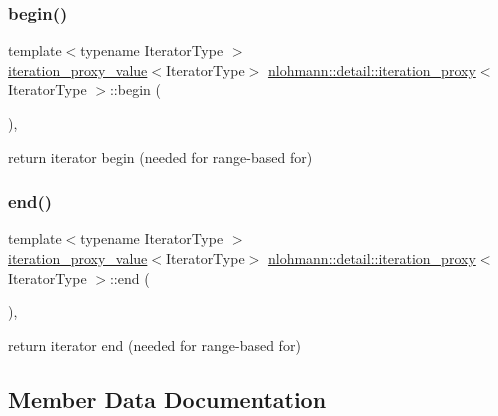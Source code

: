 \subsubsection{\texorpdfstring{begin()}{begin()}}
{\footnotesize\ttfamily template$<$typename Iterator\+Type $>$ \\
\mbox{\hyperlink{classnlohmann_1_1detail_1_1iteration__proxy__value}{iteration\+\_\+proxy\+\_\+value}}$<$Iterator\+Type$>$ \mbox{\hyperlink{classnlohmann_1_1detail_1_1iteration__proxy}{nlohmann\+::detail\+::iteration\+\_\+proxy}}$<$ Iterator\+Type $>$\+::begin (\begin{DoxyParamCaption}{ }\end{DoxyParamCaption})\hspace{0.3cm}{\ttfamily [inline]}, {\ttfamily [noexcept]}}



return iterator begin (needed for range-\/based for) 

\mbox{\label{classnlohmann_1_1detail_1_1iteration__proxy_a90091f8492d23576edef72c5e8b9d4cf}} 
\subsubsection{\texorpdfstring{end()}{end()}}
{\footnotesize\ttfamily template$<$typename Iterator\+Type $>$ \\
\mbox{\hyperlink{classnlohmann_1_1detail_1_1iteration__proxy__value}{iteration\+\_\+proxy\+\_\+value}}$<$Iterator\+Type$>$ \mbox{\hyperlink{classnlohmann_1_1detail_1_1iteration__proxy}{nlohmann\+::detail\+::iteration\+\_\+proxy}}$<$ Iterator\+Type $>$\+::end (\begin{DoxyParamCaption}{ }\end{DoxyParamCaption})\hspace{0.3cm}{\ttfamily [inline]}, {\ttfamily [noexcept]}}



return iterator end (needed for range-\/based for) 



\subsection{Member Data Documentation}
\mbox{\label{classnlohmann_1_1detail_1_1iteration__proxy_a88c0532ba4a5de1d527b18053b24fd19}} 
